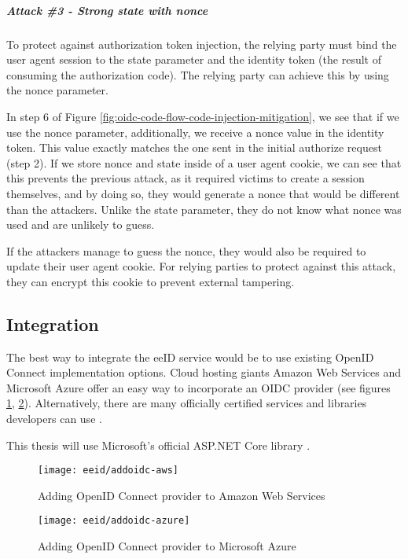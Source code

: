\subparagraph{Attack \#3 - Strong state with nonce}

To protect against authorization token injection, the relying party must bind the user agent session to the state parameter and the identity token (the result of consuming the authorization code). The relying party can achieve this by using the nonce parameter.

In step 6 of Figure \ref{fig:oidc-code-flow-code-injection-mitigation}, we see that if we use the nonce parameter, additionally, we receive a nonce value in the identity token. This value exactly matches the one sent in the initial {authorize} request (step 2). If we store nonce and state inside of a user agent cookie, we can see that this prevents the previous attack, as it required victims to create a session themselves, and by doing so, they would generate a nonce that would be different than the attackers. Unlike the state parameter, they do not know what nonce was used and are unlikely to guess.

If the attackers manage to guess the nonce, they would also be required to update their user agent cookie. For {relying parties} to protect against this attack, they can encrypt this cookie to prevent external tampering.

\subsection{Integration}

The best way to integrate the eeID service would be to use existing OpenID Connect implementation options. Cloud hosting giants Amazon Web Services and Microsoft Azure offer an easy way to incorporate an OIDC provider (see figures \ref{fig:addoidc-aws}, \ref{fig:addoidc-azure}). Alternatively, there are many officially certified services and libraries developers can use \cite{oidc-certified}.

This thesis will use Microsoft's official ASP.NET Core library \cite{ms-auth-oidc-src}.

\begin{figure}
  \centering
  \texttt{[image: eeid/addoidc-aws]}
  \caption{Adding OpenID Connect provider to Amazon Web Services}
  \label{fig:addoidc-aws}
\end{figure}

\begin{figure}
  \centering
  \texttt{[image: eeid/addoidc-azure]}
  \caption{Adding OpenID Connect provider to Microsoft Azure}
  \label{fig:addoidc-azure}
\end{figure}


